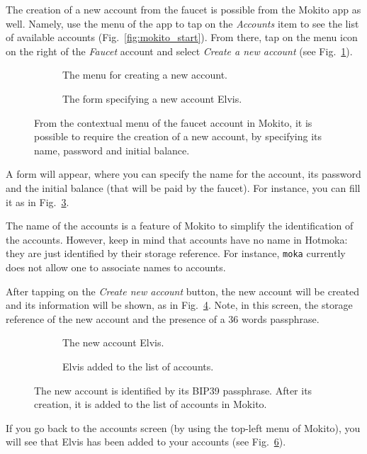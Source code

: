 The creation of a new account from the faucet is possible from the Mokito app as well.
Namely, use the menu of the app to tap on the \emph{Accounts} item to see the
list of available accounts (Fig.~\ref{fig:mokito_start}). From there, tap on the
menu icon on the right of the \emph{Faucet} account and select \emph{Create a new account}
(see Fig.~\ref{fig:mokito_new_account}).
%
\begin{figure}
\centering
\begin{subfigure}{.5\textwidth}
  \centering
  \caption{The menu for creating a new account.}
  \label{fig:mokito_new_account}
\end{subfigure}%
\begin{subfigure}{.5\textwidth}
  \centering
  \caption{The form specifying a new account Elvis.}
  \label{fig:mokito_elvis_new_account}
\end{subfigure}
\caption{From the contextual menu of the faucet account in Mokito, it is possible to require the creation of a new account, by specifying its name, password and initial balance.}
\end{figure}
%
A form will appear, where you can specify the
name for the account, its password and the initial balance (that will be paid by the faucet).
For instance, you can fill it as in Fig.~\ref{fig:mokito_elvis_new_account}.
%
\begin{commentbox}
The name of the accounts is a feature of Mokito to simplify the identification
of the accounts. However, keep in mind that accounts have no name in Hotmoka: they
are just identified by their storage reference. For instance, \texttt{moka} currently does not
allow one to associate names to accounts.
\end{commentbox}
%
After tapping on the \emph{Create new account} button, the new account will be created and
its information will be shown, as in Fig.~\ref{fig:mokito_show_elvis}.
Note, in this screen, the storage reference of the new account
and the presence of a 36 words passphrase.
%
\begin{figure}
\centering
\begin{subfigure}{.5\textwidth}
  \centering
  \caption{The new account Elvis.}
  \label{fig:mokito_show_elvis}
\end{subfigure}%
\begin{subfigure}{.5\textwidth}
  \centering
  \caption{Elvis added to the list of accounts.}
  \label{fig:mokito_added_elvis}
\end{subfigure}
\caption{The new account is identified by its BIP39 passphrase. After its creation, it is added to the list of accounts in Mokito.}
\end{figure}
%
If you go back to the accounts screen (by using the top-left menu of Mokito),
you will see that Elvis
has been added to your accounts (see Fig.~\ref{fig:mokito_added_elvis}).

